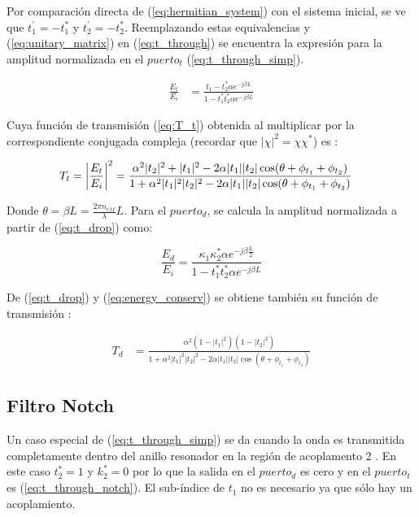 Por comparación directa de (\ref{eq:hermitian_system}) con el sistema inicial, 
se ve que $t_1^{'} = -t_1^*$ y $t_2^{'} = -t_2^*$.
Reemplazando estas equivalencias y  
(\ref{eq:unitary_matrix}) en (\ref{eq:t_through}) se encuentra la
expresión para la amplitud normalizada en el $puerto_t$ (\ref{eq:t_through_simp}).

\begin{align}
\frac{E_t}{E_i} &= 
    \frac{t_1 - t_2^* \alpha e^{-j \beta L}}
    {1 - t_1^* t_2^* \alpha e^{-j \beta L}} \label{eq:t_through_simp}
\end{align} 

Cuya función de transmisión (\ref{eq:T_t}) obtenida al multiplicar
por la correspondiente conjugada compleja (recordar que $|\chi|^2 = \chi \chi^*$)
es \cite{paloczi2005polymer}:

\begin{align}
 T_t &= \abs*{\frac{E_t}{E_i}}^2 = 
    \frac{\alpha^2 |t_2|^2 + |t_1|^2 - 2\alpha |t_1||t_2| 
	\cos(\theta + \phi_{t_1} + \phi_{t_2}) }
    {1 + \alpha^2|t_1|^2 |t_2|^2 - 2\alpha |t_1||t_2|
	\cos(\theta + \phi_{t_1} + \phi_{t_2}) }
\label{eq:T_t}
\end{align} 

Donde $\theta = \beta L = \frac{2\pi n_{eff}}{\lambda} L$. Para el $puerto_d$, se calcula la amplitud normalizada a partir de (\ref{eq:t_drop}) como:

\begin{equation}
\frac{E_d}{E_i} = \frac{ \kappa_1 \kappa_2^* \alpha e^{ -j \beta \frac{L}{2}} }
	   { 1 - t_1^* t_2^* \alpha e^{-j \beta L} }
\label{eq:t_drop_simp}
\end{equation} 

De (\ref{eq:t_drop}) y (\ref{eq:energy_conserv}) se obtiene también su función de
transmisión \cite{abujnah2012numerical}:

\begin{align}
 T_d &= 
    \frac{\alpha^2 (1-|t_1|^2) (1-|t_2|^2)}
    {1 + \alpha^2|t_1|^2 |t_2|^2 - 2\alpha |t_1||t_2|
	\cos(\theta + \phi_{t_1} + \phi_{t_2}) }
\label{eq:T_d}
\end{align} 

\subsection{Filtro Notch}

Un caso especial de (\ref{eq:t_through_simp}) se da cuando la onda es 
transmitida completamente dentro del anillo resonador en la región de acoplamento 2 \cite{yariv2006photonics}. 
En este caso $t_2^* = 1$ y $k_2^* = 0$ por lo que la salida en el $puerto_d$ es cero y
en el $puerto_t$ es (\ref{eq:t_through_notch}).
El sub-índice de $t_1$ no es necesario ya que sólo hay un acoplamiento.

